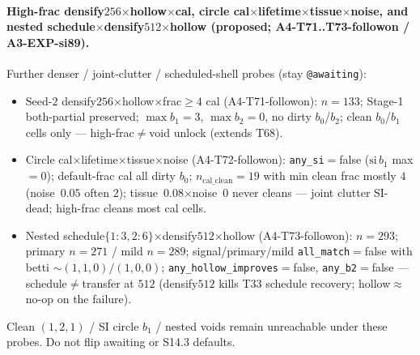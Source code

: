 \documentclass[11pt]{article}
\begin{document}
\paragraph{High-frac densify$256$$\times$hollow$\times$cal, circle
cal$\times$lifetime$\times$tissue$\times$noise, and nested
schedule$\times$densify$512$$\times$hollow (proposed; A4-T71..T73-followon /
A3-EXP-si89).}
Further denser / joint-clutter / scheduled-shell probes (stay
\texttt{@awaiting}):
\begin{itemize}[leftmargin=1.5em]
  \item Seed-$2$ densify$256$$\times$hollow$\times$frac$\ge 4$ cal
  (A4-T71-followon): $n{=}133$; Stage-1 both-partial preserved;
  $\max b_1{=}3$, $\max b_2{=}0$, no dirty $b_0$/$b_2$; clean $b_0$/$b_1$
  cells only --- high-frac$\neq$void unlock (extends T68).
  \item Circle cal$\times$lifetime$\times$tissue$\times$noise
  (A4-T72-followon): \texttt{any\_si}${=}$false ($\mathrm{si}\,b_1$
  max${=}0$); default-frac cal all dirty $b_0$;
  $n_{\mathrm{cal\_clean}}{=}19$ with min clean frac mostly $4$
  (noise~$0.05$ often $2$); tissue~$0.08$$\times$noise~$0$ never
  cleans --- joint clutter SI-dead; high-frac cleans most cal cells.
  \item Nested schedule$\{1{:}3,2{:}6\}$$\times$densify$512$$\times$hollow
  (A4-T73-followon): $n{=}293$; primary $n{=}271$ / mild $n{=}289$;
  signal/primary/mild \texttt{all\_match}${=}$false with betti
  $\sim(1,1,0)/(1,0,0)$; \texttt{any\_hollow\_improves}${=}$false,
  \texttt{any\_b2}${=}$false --- schedule$\neq$transfer at $512$
  (densify$512$ kills T33 schedule recovery; hollow$\approx$no-op on
  the failure).
\end{itemize}
Clean $(1,2,1)$ / SI circle $b_1$ / nested voids remain unreachable under
these probes. Do not flip awaiting or S14.3 defaults.
\end{document}
